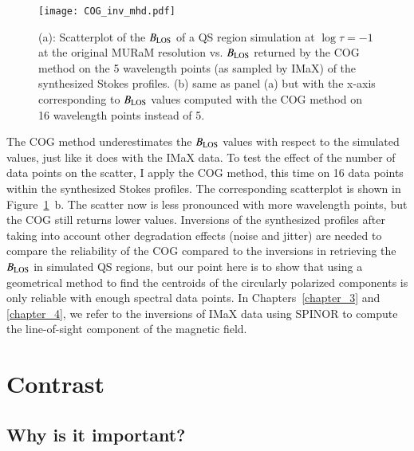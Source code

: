 \documentclass[goettingen, gauss, print]{thesis}
\begin{document}
\begin{figure}
\centering
\hspace*{-1.5cm}\texttt{[image: COG\_inv\_mhd.pdf]}
\caption{(a): Scatterplot of the $B_{\rm LOS}$ of a QS region simulation at $\log \tau=-1$ at the original MURaM resolution vs. $B_{\rm LOS}$ returned by the COG method on the 5 wavelength points (as sampled by IMaX) of the synthesized Stokes profiles. (b) same as panel (a) but with the x-axis corresponding to $B_{\rm LOS}$ values computed with the COG method on 16 wavelength points instead of 5. }
\label{cog_inv_mhd}
\end{figure}


The COG method underestimates the $B_{\rm LOS}$ values with respect to the simulated values, just like it does with the IMaX data. To test the effect of the number of data points on the scatter, I apply the COG method, this time on 16 data points within the synthesized Stokes profiles. The corresponding scatterplot is shown in Figure~\ref{cog_inv_mhd}~b. The scatter now is less pronounced with more wavelength points, but the COG still returns lower values. Inversions of the synthesized profiles after taking into account other degradation effects (noise and jitter) are needed to compare the reliability of the COG compared to the inversions in retrieving the  $B_{\rm LOS}$ in simulated QS regions, but our point here is to show that using a geometrical method to find the centroids of the circularly polarized components is only reliable with enough spectral data points. In Chapters~\ref{chapter_3} and \ref{chapter_4}, we refer to the inversions of IMaX data using SPINOR to compute the line-of-sight component of the magnetic field.


\section{Contrast}
\label{intro-contrast}
\subsection{Why is it important?}
\end{document}

